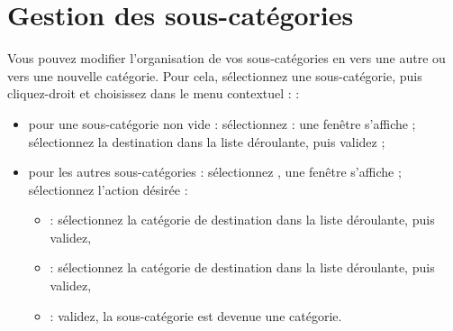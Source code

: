 \ifIllustration
\fi

\section{Gestion des sous-catégories\label{categories-management}}


Vous pouvez modifier l'organisation de vos sous-catégories en  vers une autre ou vers une nouvelle catégorie. Pour cela, sélectionnez une sous-catégorie, puis cliquez-droit et choisissez dans le menu contextuel \ifIllustration {} :
\else  :
\fi

\begin{itemize}
	 \item pour une sous-catégorie  non vide : sélectionnez   : une fenêtre s'affiche ; sélectionnez la destination dans la liste déroulante, puis validez ;

	 \item pour les autres sous-catégories : sélectionnez , une fenêtre s'affiche ; sélectionnez l'action désirée  :
		\begin{itemize}
			 \item {} : sélectionnez la catégorie de destination dans la liste déroulante, puis validez,
			 \item {} : sélectionnez la catégorie de destination dans la liste déroulante, puis validez,
			 \item {} : validez, la sous-catégorie est devenue une catégorie.
		\end{itemize}
\end{itemize}

